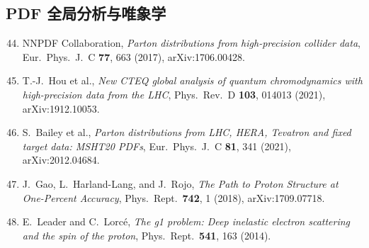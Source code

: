 \documentclass[11pt,a4paper]{ctexart}
\begin{document}
\subsection*{PDF 全局分析与唯象学}
\begin{enumerate}\setcounter{enumi}{43}
  \item NNPDF Collaboration, \textit{Parton distributions from
  high-precision collider data}, Eur.\ Phys.\ J.\ C \textbf{77}, 663
  (2017), arXiv:1706.00428.
  \item T.-J.~Hou et al., \textit{New CTEQ global analysis of quantum
  chromodynamics with high-precision data from the LHC}, Phys.\ Rev.\ D
  \textbf{103}, 014013 (2021), arXiv:1912.10053.
  \item S.~Bailey et al., \textit{Parton distributions from LHC, HERA,
  Tevatron and fixed target data: MSHT20 PDFs}, Eur.\ Phys.\ J.\ C
  \textbf{81}, 341 (2021), arXiv:2012.04684.
  \item J.~Gao, L.~Harland-Lang, and J.~Rojo, \textit{The Path to Proton
  Structure at One-Percent Accuracy}, Phys.\ Rept.\ \textbf{742}, 1
  (2018), arXiv:1709.07718.
  \item E.~Leader and C.~Lorc\'e, \textit{The g1 problem: Deep
  inelastic electron scattering and the spin of the proton},
  Phys.\ Rept.\ \textbf{541}, 163 (2014).
\end{enumerate}
\end{document}
